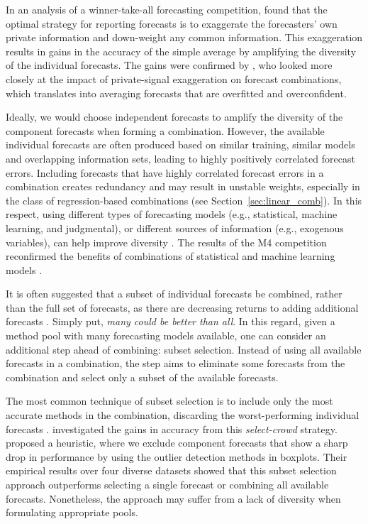 \documentclass[a4paper,11pt]{article}
\begin{document}
In an analysis of a winner-take-all forecasting competition, \citet{Lichtendahl2013-ws} found that the optimal strategy for reporting forecasts is to exaggerate the forecasters' own private information and down-weight any common information. This exaggeration results in gains in the accuracy of the simple average by amplifying the diversity of the individual forecasts. The gains were confirmed by \citet{Grushka-Cockayne2017-dj}, who looked more closely at the impact of private-signal exaggeration on forecast combinations, which translates into averaging forecasts that are overfitted and overconfident.

Ideally, we would choose independent forecasts to amplify the diversity of the component forecasts when forming a combination. However, the available individual forecasts are often produced based on similar training, similar models and overlapping information sets, leading to highly positively correlated forecast errors. Including forecasts that have highly correlated forecast errors in a combination creates redundancy and may result in unstable weights, especially in the class of regression-based combinations (see Section~\ref{sec:linear_comb}). In this respect, using different types of forecasting models (e.g., statistical, machine learning, and judgmental), or different sources of information (e.g., exogenous variables), can help improve diversity \citep{Atiya2020-ge}. The results of the M4 competition reconfirmed the benefits of combinations of statistical and machine learning models \citep{Makridakis2020-hu}.

It is often suggested that a subset of individual forecasts be combined, rather than the full set of forecasts, as there are decreasing returns to adding additional forecasts \citep{Armstrong2001-sj,Zhou2002-cg,Hibon2005-ok,Geweke2011-xk,Diebold2019-ml,Lichtendahl2020-ut}. Simply put, \textit{many could be better than all}. In this regard, given a method pool with many forecasting models available, one can consider an additional step ahead of combining: subset selection. Instead of using all available forecasts in a combination, the step aims to eliminate some forecasts from the combination and select only a subset of the available forecasts.

The most common technique of subset selection is to include only the most accurate methods in the combination, discarding the worst-performing individual forecasts \citep[e.g.,][]{Granger2004-sw}. \citet{Mannes2014-dl} investigated the gains in accuracy from this \textit{select-crowd} strategy. \citet{Kourentzes2019-na} proposed a heuristic, where we exclude component forecasts that show a sharp drop in performance by using the outlier detection methods in boxplots. Their empirical results over four diverse datasets showed that this subset selection approach outperforms selecting a single forecast or combining all available forecasts. Nonetheless, the approach may suffer from a lack of diversity when formulating appropriate pools.
\end{document}
